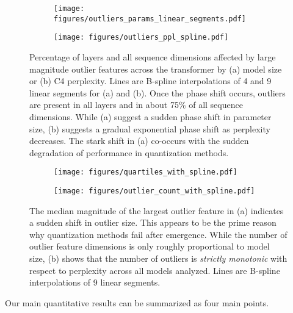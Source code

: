 \documentclass{article}
\begin{document}
\begin{figure}
\centering
  \begin{subfigure}[b]{0.45\textwidth}
         \texttt{[image: figures/outliers\_params\_linear\_segments.pdf]}
        \caption{}
        \label{fig:outlier_param}
     \end{subfigure}
     \hfill
     \begin{subfigure}[b]{0.45\textwidth}
     \texttt{[image: figures/outliers\_ppl\_spline.pdf]}
        \caption{}
        \label{fig:outlier_ppl}
     \end{subfigure}
        \caption{Percentage of layers and all sequence dimensions affected by large magnitude outlier features across the transformer by (a) model size or (b) C4 perplexity. Lines are B-spline interpolations of 4 and 9 linear segments for (a) and (b). Once the phase shift occurs, outliers are present in all layers and in about 75\% of all sequence dimensions. While (a) suggest a sudden phase shift in parameter size, (b) suggests a gradual exponential phase shift as perplexity decreases. The stark shift in (a) co-occurs with the sudden degradation of performance in quantization methods.}
        \label{fig:emergence}
\end{figure}


\begin{figure}
\centering
  \begin{subfigure}[b]{0.45\textwidth}
         \texttt{[image: figures/quartiles\_with\_spline.pdf]}
        \caption{}
        \label{fig:quartiles}
     \end{subfigure}
     \hfill
     \begin{subfigure}[b]{0.45\textwidth}
     \texttt{[image: figures/outlier\_count\_with\_spline.pdf]}
        \caption{}
        \label{fig:outlier_count}
     \end{subfigure}
        \caption{The median magnitude of the largest outlier feature in (a) indicates a sudden shift in outlier size. This appears to be the prime reason why quantization methods fail after emergence. While the number of outlier feature dimensions is only roughly proportional to model size, (b) shows that the number of outliers is {\it strictly monotonic} with respect to perplexity across all models analyzed. Lines are B-spline interpolations of 9 linear segments.}
        \label{fig:outliers}
\end{figure}

Our main quantitative results can be summarized as four main points. 
\end{document}
